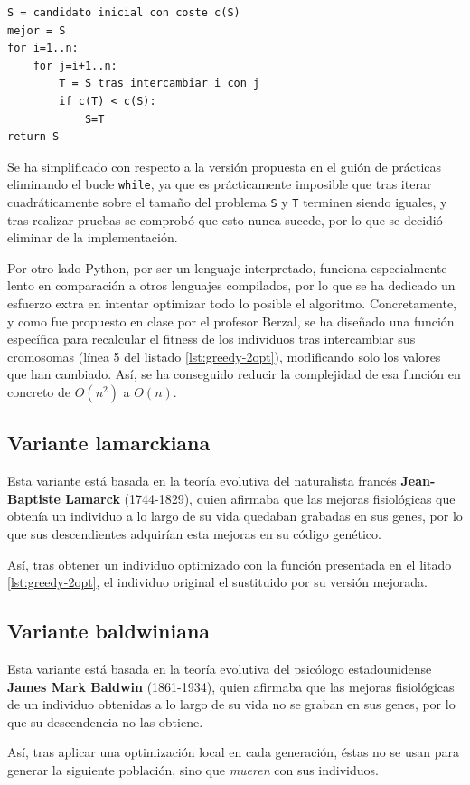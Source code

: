\begin{lstlisting}[caption={Optimización greedy 2-opt}, label={lst:greedy-2opt}]
S = candidato inicial con coste c(S) 
mejor = S
for i=1..n:
    for j=i+1..n:
        T = S tras intercambiar i con j 
        if c(T) < c(S):
            S=T
return S
\end{lstlisting}

Se ha simplificado con respecto a la versión propuesta en el guión de prácticas eliminando el bucle \texttt{while}, ya que es prácticamente imposible que tras iterar cuadráticamente sobre el tamaño del problema \texttt{S} y \texttt{T} terminen siendo iguales, y tras realizar pruebas se comprobó que esto nunca sucede, por lo que se decidió eliminar de la implementación.

Por otro lado Python, por ser un lenguaje interpretado, funciona especialmente lento en comparación a otros lenguajes compilados, por lo que se ha dedicado un esfuerzo extra en intentar optimizar todo lo posible el algoritmo. Concretamente, y como fue propuesto en clase por el profesor Berzal, se ha diseñado una función específica para recalcular el fitness de los individuos tras intercambiar sus cromosomas (línea 5 del listado \ref{lst:greedy-2opt}), modificando solo los valores que han cambiado. Así, se ha conseguido reducir la complejidad de esa función en concreto de $O(n^2)$ a $O(n)$. 

\subsection{Variante lamarckiana}

Esta variante está basada en la teoría evolutiva del naturalista francés \textbf{Jean-Baptiste Lamarck} (1744-1829), quien afirmaba que las mejoras fisiológicas que obtenía un individuo a lo largo de su vida  quedaban grabadas en sus genes, por lo que sus descendientes adquirían esta mejoras en su código genético.

Así, tras obtener un individuo optimizado con la función presentada en el litado \ref{lst:greedy-2opt}, el individuo original el sustituido por su versión mejorada.

\subsection{Variante baldwiniana}

Esta variante está basada en la teoría evolutiva del psicólogo estadounidense \textbf{James Mark Baldwin} (1861-1934), quien afirmaba que las mejoras fisiológicas de un individuo obtenidas a lo largo de su vida no se graban en sus genes, por lo que su descendencia no las obtiene.

Así, tras aplicar una optimización local en cada generación, éstas no se usan para generar la siguiente población, sino que \textit{mueren} con sus individuos.